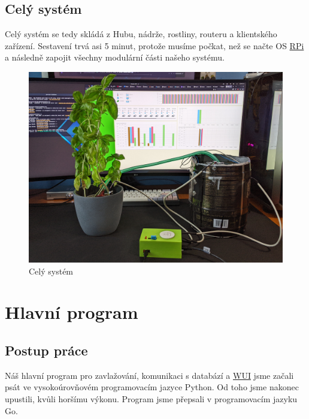 \documentclass[czech,12pt,a4paper]{article}
\begin{document}
\clearpage

\subsection{Celý systém}

Celý systém se tedy skládá z Hubu, nádrže, rostliny, routeru a klientského zařízení. Sestavení trvá asi 5 minut, protože musíme počkat, než se načte OS \underline{\ac{RPi}} a následně zapojit všechny modulární části našeho systému.

\begin{figure}[h]
	\centering
	\includegraphics[width=0.9\linewidth]{planthub.jpeg}
	\caption{Celý systém}
\end{figure}

\clearpage

\section{Hlavní program}

\subsection{Postup práce}

Náš hlavní program pro zavlažování, komunikaci s databází a \underline{\ac{WUI}} jsme začali psát ve vysokoúrovňovém programovacím jazyce Python. Od toho jsme nakonec upustili, kvůli horšímu výkonu. Program jsme přepsali v programovacím jazyku Go.
\end{document}
